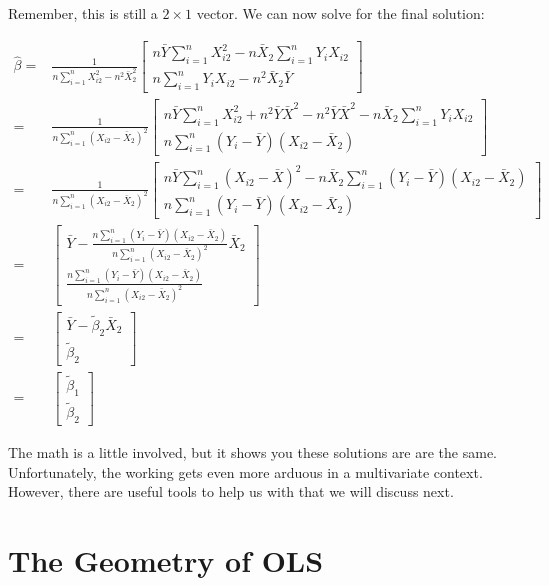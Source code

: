 \documentclass[
  letterpaper,
  DIV=11,
  numbers=noendperiod]{scrreprt}
\begin{document}
Remember, this is still a \(2\times 1\) vector. We can now solve for the
final solution:

\[
\begin{align}
\hat{\beta} =& \frac{1}{n\sum_{i=1}^nX_{i2}^2-n^2\bar{X}_2^2}\begin{bmatrix} n\bar{Y}\sum_{i=1}^nX_{i2}^2 -n\bar{X}_2\sum_{i=1}^nY_iX_{i2} \\ n\sum_{i=1}^nY_iX_{i2}-n^2\bar{X}_2\bar{Y}\end{bmatrix} \\
=& \frac{1}{n\sum_{i=1}^n(X_{i2}-\bar{X}_2)^2}\begin{bmatrix} n\bar{Y}\sum_{i=1}^nX_{i2}^2 + n^2\bar{Y}\bar{X}^2 - n^2\bar{Y}\bar{X}^2 -n\bar{X}_2\sum_{i=1}^nY_iX_{i2} \\ n\sum_{i=1}^n(Y_i-\bar{Y})(X_{i2}-\bar{X}_2) \end{bmatrix} \\
=& \frac{1}{n\sum_{i=1}^n(X_{i2}-\bar{X}_2)^2}\begin{bmatrix} n\bar{Y}\sum_{i=1}^n(X_{i2}-\bar{X})^2 -n\bar{X}_2\sum_{i=1}^n(Y_i-\bar{Y})(X_{i2}-\bar{X}_2) \\ n\sum_{i=1}^n(Y_i-\bar{Y})(X_{i2}-\bar{X}_2) \end{bmatrix} \\
=& \begin{bmatrix} \bar{Y}  -\frac{n\sum_{i=1}^n(Y_i-\bar{Y})(X_{i2}-\bar{X}_2)}{n\sum_{i=1}^n(X_{i2}-\bar{X}_2)^2}\bar{X}_2 \\ \frac{n\sum_{i=1}^n(Y_i-\bar{Y})(X_{i2}-\bar{X}_2)}{n\sum_{i=1}^n(X_{i2}-\bar{X}_2)^2} \end{bmatrix} \\
=& \begin{bmatrix} \bar{Y}  -\tilde{\beta}_2\bar{X}_2 \\ \tilde{\beta}_2 \end{bmatrix} \\
=& \begin{bmatrix}\tilde{\beta}_1 \\ \tilde{\beta}_2 \end{bmatrix}
\end{align}
\]

The math is a little involved, but it shows you these solutions are are
the same. Unfortunately, the working gets even more arduous in a
multivariate context. However, there are useful tools to help us with
that we will discuss next.


\hypertarget{sec-geometry}{%
\chapter{The Geometry of OLS}\label{sec-geometry}}
\end{document}
